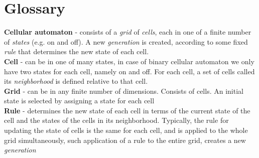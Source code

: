 \documentclass{article}
\begin{document}
\newpage
\section{Glossary} \par


\setlength{\parindent}{5ex}
\Large {\bf \hspace{15pt} Cellular automaton } - consists of a \textit{grid} of \textit{cells}, each in one of a finite number of \textit{states} (e.g. on and off). 
	A new \textit{generation} is created, according to some fixed
	\textit{rule} that determines the new state of each cell. \\


\Large {\bf 
	Cell 
}	
	- can be in one of many states,
	in case of binary cellular automaton we only have two states for each cell, namely on and off.
	For each cell, a set of cells called its
	\textit{neighborhood} is defined relative to that cell.	\\


\Large {\bf 
	Grid
} 	
	- can be in any finite number of dimensions. Consists of cells.
	An initial state is selected by assigning a state for each cell \\


\Large {\bf Rule
} 
	- determines the new state of each cell in terms of the current state
	of the cell and the states of the cells in its neighborhood.
	Typically, the rule for updating the state of cells is the same for each
	cell, and is applied to the whole grid simultaneously, such application of
	a rule to the entire grid, creates a new \textit{generation} \\

\newpage	
\end{document}

